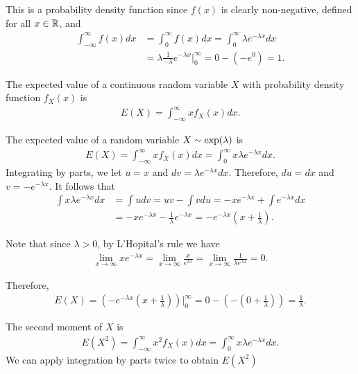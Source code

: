 \begin{exmp}
    This is a probability density function since $f(x)$ is clearly non-negative, defined for all $x \in \mathbb{R}$, and
    \begin{align*}
        \int_{-\infty}^{\infty}f(x)dx &= \int_{0}^{\infty}f(x)dx = \int_{0}^{\infty}\lambda e^{-\lambda x}dx \\
        &= \lambda \frac{1}{-\lambda}e^{-\lambda x}\big\rvert_{0}^{\infty} = 0 - (-e^{0}) = 1.
    \end{align*}
\end{exmp}

\begin{defn}
    The expected value of a continuous random variable $X$ with probability density function $f_X(x)$ is
    \begin{align*}
        E(X) = \int_{-\infty}^{\infty}xf_X(x)dx.
    \end{align*}
\end{defn}

\begin{exmp}
    The expected value of a random variable $X \sim \mathrm{exp}(\lambda)$ is
    \begin{align*}
        E(X) = \int_{-\infty}^{\infty}xf_X(x)dx = \int_{0}^{\infty}x\lambda e^{-\lambda x}dx.
    \end{align*}
    Integrating by parts, we let $u = x$ and $dv = \lambda e^{-\lambda x}dx$. Therefore, $du = dx$ and $v = -e^{-\lambda x}$. It follows that
    \begin{align*}
        \int x\lambda e^{-\lambda x}dx &= \int udv = uv - \int vdu = -xe^{-\lambda x} + \int e^{-\lambda x}dx \\
        &= -xe^{-\lambda x} - \frac{1}{\lambda}e^{-\lambda x} = -e^{-\lambda x}\left(x + \frac{1}{\lambda}\right).
    \end{align*}

    Note that since $\lambda > 0$, by L'Hopital's rule we have
    \begin{align*}
        \lim_{x \to \infty}xe^{-\lambda x} = \lim_{x \to \infty}\frac{x}{e^{\lambda x}} = \lim_{x \to \infty}\frac{1}{\lambda e^{\lambda x}} = 0.
    \end{align*}

    Therefore,
    \begin{align*}
        E(X) = \left(-e^{-\lambda x}\left(x + \frac{1}{\lambda}\right)\right)\big\rvert_{0}^{\infty} = 0 - \left(-\left(0 + \frac{1}{\lambda}\right)\right) = \frac{1}{\lambda}.
    \end{align*}

    The second moment of $X$ is
    \begin{align*}
        E(X^2) = \int_{-\infty}^{\infty}x^2f_X(x)dx = \int_{0}^{\infty}x\lambda e^{-\lambda x}dx.
    \end{align*}
    We can apply integration by parts twice to obtain $E(X^2)$
\end{exmp}

